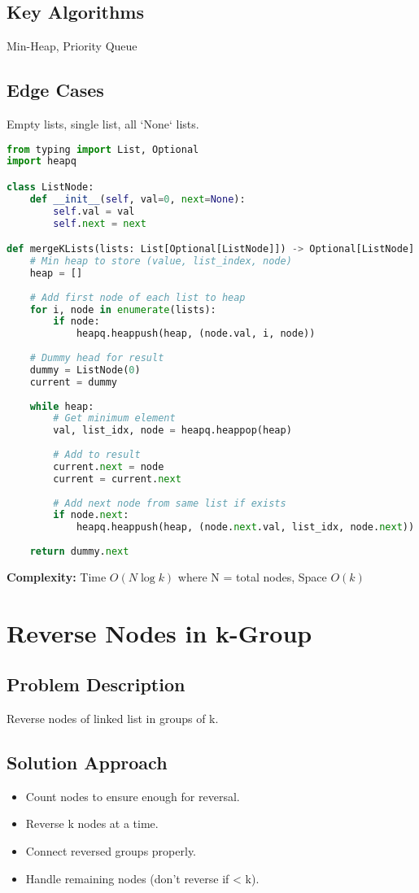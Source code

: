 \documentclass[10pt, a4paper]{article}
\begin{document}
\subsection*{Key Algorithms}
Min-Heap, Priority Queue

\subsection*{Edge Cases}
Empty lists, single list, all `None` lists.

\begin{lstlisting}[language=Python]
from typing import List, Optional
import heapq

class ListNode:
    def __init__(self, val=0, next=None):
        self.val = val
        self.next = next

def mergeKLists(lists: List[Optional[ListNode]]) -> Optional[ListNode]:
    # Min heap to store (value, list_index, node)
    heap = []
    
    # Add first node of each list to heap
    for i, node in enumerate(lists):
        if node:
            heapq.heappush(heap, (node.val, i, node))
    
    # Dummy head for result
    dummy = ListNode(0)
    current = dummy
    
    while heap:
        # Get minimum element
        val, list_idx, node = heapq.heappop(heap)
        
        # Add to result
        current.next = node
        current = current.next
        
        # Add next node from same list if exists
        if node.next:
            heapq.heappush(heap, (node.next.val, list_idx, node.next))
    
    return dummy.next
\end{lstlisting}
\textbf{Complexity:} Time $O(N \log k)$ where N = total nodes, Space $O(k)$

\section{Reverse Nodes in k-Group}
\subsection*{Problem Description}
Reverse nodes of linked list in groups of k.

\subsection*{Solution Approach}
\begin{itemize}
    \item Count nodes to ensure enough for reversal.
    \item Reverse k nodes at a time.
    \item Connect reversed groups properly.
    \item Handle remaining nodes (don't reverse if < k).
\end{itemize}
\end{document}
